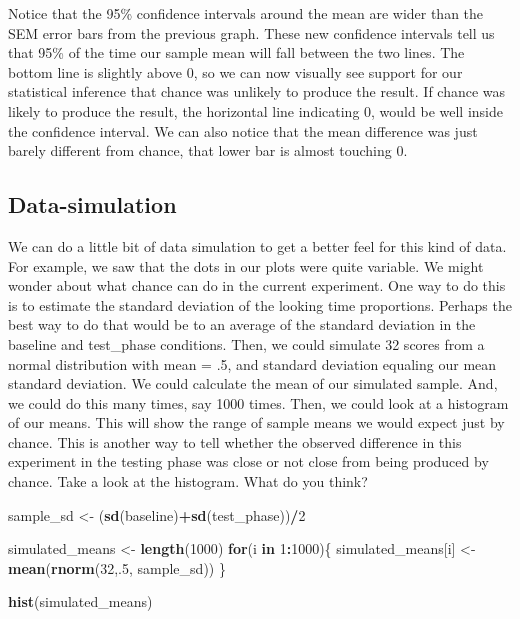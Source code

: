 \documentclass[]{book}
\newenvironment{Shaded}{\begin{snugshade}}{\end{snugshade}}
\newcommand{\KeywordTok}[1]{\textcolor[rgb]{0.13,0.29,0.53}{\textbf{#1}}}
\newcommand{\DecValTok}[1]{\textcolor[rgb]{0.00,0.00,0.81}{#1}}
\newcommand{\StringTok}[1]{\textcolor[rgb]{0.31,0.60,0.02}{#1}}
\newcommand{\ControlFlowTok}[1]{\textcolor[rgb]{0.13,0.29,0.53}{\textbf{#1}}}
\newcommand{\OperatorTok}[1]{\textcolor[rgb]{0.81,0.36,0.00}{\textbf{#1}}}
\newcommand{\NormalTok}[1]{#1}
\begin{document}
Notice that the 95\% confidence intervals around the mean are wider than
the SEM error bars from the previous graph. These new confidence
intervals tell us that 95\% of the time our sample mean will fall
between the two lines. The bottom line is slightly above 0, so we can
now visually see support for our statistical inference that chance was
unlikely to produce the result. If chance was likely to produce the
result, the horizontal line indicating 0, would be well inside the
confidence interval. We can also notice that the mean difference was
just barely different from chance, that lower bar is almost touching 0.

\subsection{Data-simulation}\label{data-simulation}

We can do a little bit of data simulation to get a better feel for this
kind of data. For example, we saw that the dots in our plots were quite
variable. We might wonder about what chance can do in the current
experiment. One way to do this is to estimate the standard deviation of
the looking time proportions. Perhaps the best way to do that would be
to an average of the standard deviation in the baseline and test\_phase
conditions. Then, we could simulate 32 scores from a normal distribution
with mean = .5, and standard deviation equaling our mean standard
deviation. We could calculate the mean of our simulated sample. And, we
could do this many times, say 1000 times. Then, we could look at a
histogram of our means. This will show the range of sample means we
would expect just by chance. This is another way to tell whether the
observed difference in this experiment in the testing phase was close or
not close from being produced by chance. Take a look at the histogram.
What do you think?

\begin{Shaded}
\begin{Highlighting}[]
\NormalTok{sample_sd   <-}\StringTok{ }\NormalTok{(}\KeywordTok{sd}\NormalTok{(baseline)}\OperatorTok{+}\KeywordTok{sd}\NormalTok{(test_phase))}\OperatorTok{/}\DecValTok{2}

\NormalTok{simulated_means <-}\StringTok{ }\KeywordTok{length}\NormalTok{(}\DecValTok{1000}\NormalTok{)}
\ControlFlowTok{for}\NormalTok{(i }\ControlFlowTok{in} \DecValTok{1}\OperatorTok{:}\DecValTok{1000}\NormalTok{)\{}
\NormalTok{ simulated_means[i] <-}\StringTok{ }\KeywordTok{mean}\NormalTok{(}\KeywordTok{rnorm}\NormalTok{(}\DecValTok{32}\NormalTok{,.}\DecValTok{5}\NormalTok{, sample_sd))}
\NormalTok{\}}

\KeywordTok{hist}\NormalTok{(simulated_means)}
\end{Highlighting}
\end{Shaded}
\end{document}
